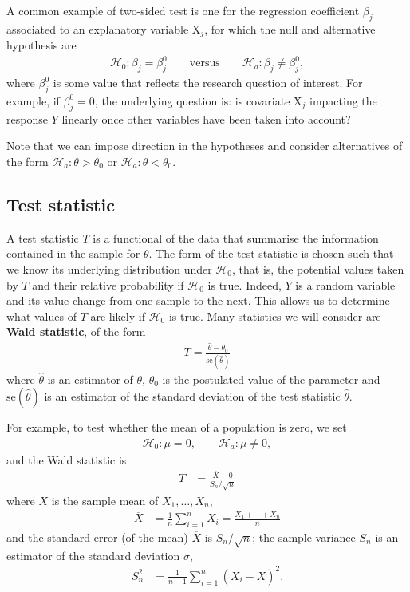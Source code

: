 \documentclass[
  11pt,
  letterpaper,
]{book}
\theoremstyle{definition}
\theoremstyle{definition}
\theoremstyle{definition}
\theoremstyle{definition}
\theoremstyle{remark}
\begin{document}
A common example of two-sided test is one for the regression coefficient \(\beta_j\) associated to an explanatory variable \(\mathrm{X}_j\), for which the null and alternative hypothesis are
\begin{align*}
\mathscr{H}_0: \beta_j=\beta_j^0 \qquad \text{versus} \qquad \mathscr{H}_a:\beta_j \neq \beta_j^0,
\end{align*}
where \(\beta_j^0\) is some value that reflects the research question of interest. For example, if \(\beta_j^0=0\), the underlying question is: is covariate \(\mathrm{X}_j\) impacting the response \(Y\) linearly once other variables have been taken into account?

Note that we can impose direction in the hypotheses and consider alternatives of the form \(\mathscr{H}_a: \theta > \theta_0\) or \(\mathscr{H}_a: \theta < \theta_0\).

\hypertarget{test-statistic}{%
\subsection{Test statistic}\label{test-statistic}}

A test statistic \(T\) is a functional of the data that summarise the information contained in the sample for \(\theta\). The form of the test statistic is chosen such that we know its underlying distribution under \(\mathscr{H}_0\), that is, the potential values taken by \(T\) and their relative probability if \(\mathscr{H}_0\) is true. Indeed, \(Y\) is a random variable and its value change from one sample to the next.
This allows us to determine what values of \(T\) are likely if \(\mathscr{H}_0\) is true. Many statistics we will consider are \textbf{Wald statistic}, of the form
\begin{align*}
T = \frac{\widehat{\theta} - \theta_0}{\mathrm{se}(\widehat{\theta})}
\end{align*}
where \(\widehat{\theta}\) is an estimator of \(\theta\), \(\theta_0\) is the postulated value of the parameter and \(\mathrm{se}(\widehat{\theta})\) is an estimator of the standard deviation of the test statistic \(\widehat{\theta}\).

For example, to test whether the mean of a population is zero, we set
\begin{align*}
\mathscr{H}_0: \mu=0, \qquad  \mathscr{H}_a:\mu \neq 0,
\end{align*}
and the Wald statistic is
\begin{align*}
T &= \frac{\overline{X}-0}{S_n/\sqrt{n}}
\end{align*}
where \(\overline{X}\) is the sample mean of \(X_1, \ldots, X_n\),
\begin{align*}
\overline{X} &= \frac{1}{n} \sum_{i=1}^n X_i = \frac{X_1+ \cdots + X_n}{n}
\end{align*}
and the standard error (of the mean) \(\overline{X}\) is \(S_n/\sqrt{n}\); the sample variance \(S_n\) is an estimator of the standard deviation \(\sigma\),
\begin{align*}
S^2_n &= \frac{1}{n-1} \sum_{i=1}^n (X_i-\overline{X})^2.
\end{align*}
\end{document}

